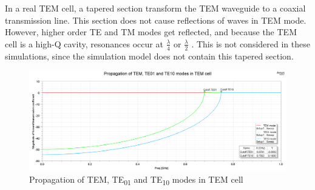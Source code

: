 
In a real TEM cell, a tapered section transform the TEM waveguide to a coaxial transmission line. This section does not cause reflections of waves in TEM mode. However, higher order TE and TM modes get reflected, and because the TEM cell is a high-Q cavity, resonances occur at $\frac{\lambda}{4}$ or $\frac{\lambda}{2}$ \cite{990711}. This is not considered in these simulations, since the simulation model does not contain this tapered section. 




\begin{figure}[h]
    \centering
    \includegraphics[width=1\linewidth]{Documentation//content//10_theory//img/te01_te10_tem_propagation.png}
    \caption{Propagation of TEM, TE\textsubscript{01} and TE\textsubscript{10} modes in TEM cell}
    \label{fig:te01_te10_tem_propagation}
\end{figure}




